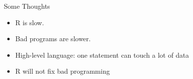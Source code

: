 \begin{frame}
  \begin{block}{Some Thoughts}
    \begin{itemize}
      \item R is slow.
      \item Bad programs are slower.
      \item High-level language: one statement can touch a lot of data
      \item R will not fix bad programming
    \end{itemize}
  \end{block}
\end{frame}



%

